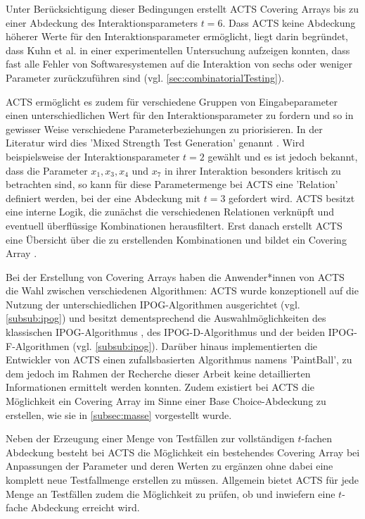 Unter Berücksichtigung dieser Bedingungen erstellt ACTS Covering Arrays bis zu einer Abdeckung des Interaktionsparameters $t = 6$. Dass ACTS keine Abdeckung höherer Werte für den Interaktionsparameter ermöglicht, liegt darin begründet, dass Kuhn et al. \cite{kuhn2004error} in einer experimentellen Untersuchung aufzeigen konnten, dass fast alle Fehler von Softwaresystemen auf die Interaktion von sechs oder weniger Parameter zurückzuführen sind (vgl. \autoref{sec:combinatorialTesting}). 

ACTS ermöglicht es zudem für verschiedene Gruppen von Eingabeparameter einen unterschiedlichen Wert für den Interaktionsparameter zu fordern und so in gewisser Weise verschiedene Parameterbeziehungen zu priorisieren. In der Literatur wird dies 'Mixed Strength Test Generation' genannt \cite{yu2013acts, czerwonka2006pairwise}. Wird beispielsweise der Interaktionsparameter $t = 2$ gewählt und es ist jedoch bekannt, dass die Parameter $x_1, x_3, x_4$ und $x_7$ in ihrer Interaktion besonders kritisch zu betrachten sind, so kann für diese Parametermenge bei ACTS eine 'Relation' \cite{yu2013acts} definiert werden, bei der eine Abdeckung mit $t = 3$ gefordert wird. ACTS besitzt eine interne Logik, die zunächst die verschiedenen Relationen verknüpft und eventuell überflüssige Kombinationen herausfiltert. Erst danach erstellt ACTS eine Übersicht über die zu erstellenden Kombinationen und bildet ein Covering Array \cite{yu2013acts}.
  
Bei der Erstellung von Covering Arrays haben die Anwender*innen von ACTS die Wahl zwischen verschiedenen Algorithmen: ACTS wurde konzeptionell auf die Nutzung der unterschiedlichen IPOG-Algorithmen ausgerichtet (vgl. \autoref{subsub:ipog}) und besitzt dementsprechend die Auswahlmöglichkeiten des klassischen IPOG-Algorithmus \cite{lei2008ipog}, des IPOG-D-Algorithmus \cite{lei2008ipog} und der beiden IPOG-F-Algorithmen \cite{forbes2008refining} (vgl. \autoref{subsub:ipog}). Darüber hinaus implementierten die Entwickler von ACTS einen zufallsbasierten Algorithmus namens 'PaintBall', zu dem jedoch im Rahmen der Recherche dieser Arbeit keine detaillierten Informationen ermittelt werden konnten. Zudem existiert bei ACTS die Möglichkeit ein Covering Array im Sinne einer Base Choice-Abdeckung zu erstellen, wie sie in \autoref{subsec:masse} vorgestellt wurde.

Neben der Erzeugung einer Menge von Testfällen zur vollständigen $t$-fachen Abdeckung besteht bei ACTS die Möglichkeit ein bestehendes Covering Array bei Anpassungen der Parameter und deren Werten zu ergänzen ohne dabei eine komplett neue Testfallmenge erstellen zu müssen. Allgemein bietet ACTS für jede Menge an Testfällen zudem die Möglichkeit zu prüfen, ob und inwiefern eine $t$-fache Abdeckung erreicht wird.

